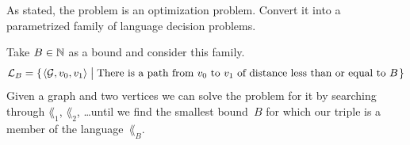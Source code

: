 \documentclass[answers, nolegalese, 11pt]{examjh}
\begin{document}
\begin{questions}
\question
As stated, the 
problem
is an optimization problem.
Convert it into a parametrized family of language decision problems.
\begin{solution}
Take $B\in\mathbb{N}$ as a bound and consider this family.
\begin{equation*}
  \lang_{B}=\set{\sequence{\mathcal{G},v_0,v_1}\suchthat\text{There is a path from $v_0$ to $v_1$ of distance less than or equal to~$B$}}
\end{equation*}
Given a graph and two vertices we can solve the  
problem for it
by searching through $\lang_1$, $\lang_2$, \ldots until we find the 
smallest bound~$B$ for which our triple is 
a member of the language~$\lang_{B}$. 
\end{solution}

\end{questions}
\end{document}
